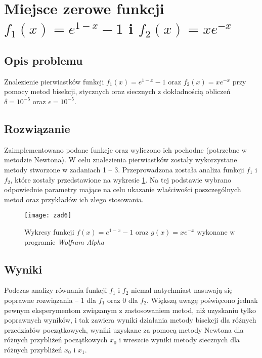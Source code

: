 \documentclass[11pt]{mk-polish-lab-report}
\begin{document}
\section{Miejsce zerowe funkcji $f_1(x) = e^{1-x} - 1$ i $f_2(x) = xe^{-x}$}

\subsection{Opis problemu}
Znalezienie pierwiastków funkcji $f_1(x)=e^{1-x}-1$ oraz $f_2(x)=xe^{-x}$ przy pomocy metod bisekcji, stycznych oraz siecznych z dokładnością obliczeń $\delta=10^{-5}$ oraz $\epsilon=10^{-5}$.

\subsection{Rozwiązanie}
Zaimplementowano podane funkcje oraz wyliczono ich pochodne (potrzebne w metodzie Newtona). W celu znalezienia pierwiastków zostały wykorzystane metody stworzone w zadaniach 1 -- 3. Przeprowadzona została analiza funkcji $f_1$ i $f_2$, które zostały przedstawione na wykresie \ref{fig:zad61}. Na tej podstawie wybrano odpowiednie parametry mające na celu ukazanie właściwości poszczególnych metod oraz przykładów ich złego stosowania.

\begin{figure}[h]
\centering
\texttt{[image: zad6]}\hfill
\caption{Wykresy funkcji $f(x)=e^{1-x}-1$ oraz $g(x)=xe^{-x}$ wykonane w programie \emph{Wolfram Alpha}} \label{fig:zad61}
\end{figure} 

\subsection{Wyniki}
Podczas analizy równania funkcji $f_1$ i $f_2$ niemal natychmiast nasuwają się poprawne rozwiązania -- $1$ dla $f_1$ oraz $0$ dla $f_2$. Większą uwagę poświęcono jednak pewnym eksperymentom związanym z zastosowaniem metod, niż uzyskaniu tylko poprawnych wyników, i tak  zawiera wyniki działania metody bisekcji dla różnych przedziałów początkowych,  wyniki uzyskane za pomocą metody Newtona dla różnych przybliżeń początkowych $x_0$ i wreszcie  wyniki metody siecznych dla różnych przybliżeń $x_0$ i $x_1$.
\end{document}
